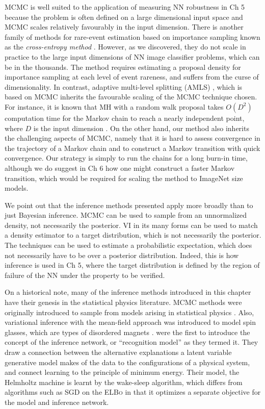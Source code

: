 MCMC is well suited to the application of measuring NN robustness in Ch 5 because the problem is often defined on a large dimensional input space and MCMC scales relatively favourably in the input dimension. There is another family of methods for rare-event estimation based on importance sampling known as the \emph{cross-entropy method} \citep{de2005tutorial}. However, as we discovered, they do not scale in practice to the large input dimensions of NN image classifier problems, which can be in the thousands. The method requires estimating a proposal density for importance sampling at each level of event rareness, and suffers from the curse of dimensionality. In contrast, adaptive multi-level splitting (AMLS) \citep{guyader2011simulation}, which is based on MCMC inherits the favourable scaling of the MCMC technique chosen. For instance, it is known that MH with a random walk proposal takes $O(D^2)$ computation time for the Markov chain to reach a nearly independent point, where $D$ is the input dimension \citep{Neal2011}. On the other hand, our method also inherits the challenging aspects of MCMC, namely that it is hard to assess convergence in the trajectory of a Markov chain and to construct a Markov transition with quick convergence. Our strategy is simply to run the chains for a long burn-in time, although we do suggest in Ch 6 how one might construct a faster Markov transition, which would be required for scaling the method to ImageNet size models.

We point out that the inference methods presented apply more broadly than to just Bayesian inference. MCMC can be used to sample from an unnormalized density, not necessarily the posterior. VI in its many forms can be used to match a density estimator to a target distribution, which is not necessarily the posterior. The techniques can be used to estimate a probabilistic expectation, which does not necessarily have to be over a posterior distribution. Indeed, this is how inference is used in Ch 5, where the target distribution is defined by the region of failure of the NN under the property to be verified.

On a historical note, many of the inference methods introduced in this chapter have their genesis in the statistical physics literature. MCMC methods were originally introduced to sample from models arising in statistical physics \citep{metropolis1953equation}. Also, variational inference with the mean-field approach was introduced to model spin glasses, which are types of disordered magnets \citep{opper2001advanced}. \citet{dayan1995helmholtz} were the first to introduce the concept of the inference network, or ``recognition model'' as they termed it. They draw a connection between the alternative explanations a latent variable generative model makes of the data to the configurations of a physical system, and connect learning to the principle of minimum energy. Their model, the Helmholtz machine is learnt by the wake-sleep algorithm, which differs from algorithms such as SGD on the {\scshape ELBo} in that it optimizes a separate objective for the model and inference network.